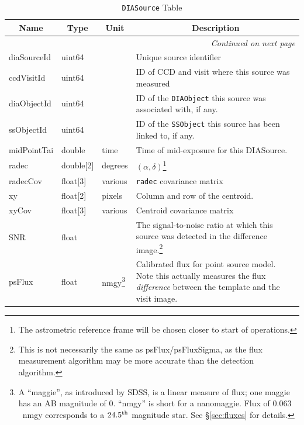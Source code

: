 \documentclass[12pt]{article}
\newcommand{\code}[1]{\texttt{#1}}
\newcommand{\DIASource}{\code{DIASource}\xspace}
\newcommand{\DIAObject}{\code{DIAObject}\xspace}
\newcommand{\SSObject}{\code{SSObject}\xspace}
\begin{document}
\begin{center}
\begin{longtable}{p{3cm}p{2cm}p{2cm}p{5cm}}
\caption[\DIASource Table]{\DIASource Table
} \\

\hline \multicolumn{1}{c}{\bf Name} & \multicolumn{1}{c}{\bf Type} & \multicolumn{1}{c}{\bf Unit} & \multicolumn{1}{c}{\bf Description} \\ \hline
\endhead

\hline \multicolumn{4}{r}{{\em Continued on next page}} \\
\endfoot

\hline\hline
\endlastfoot

diaSourceId & uint64 & ~ & Unique source identifier \\ 

ccdVisitId & uint64 & ~ & ID of CCD and visit where this source was measured \\ 

diaObjectId & uint64 & ~ & ID of the \DIAObject this source was associated with, if any. \\ 

ssObjectId & uint64 & ~ & ID of the \SSObject this source has been linked to, if any. \\ 

midPointTai & double & time & Time of mid-exposure for this DIASource. \\ 

radec & double[2] & degrees & $(\alpha, \delta)$\footnote{The astrometric reference frame will be chosen closer to start of operations.} \\ 

radecCov & float[3] & various & \texttt{radec} covariance matrix \\ 

xy & float[2] & pixels & Column and row of the centroid. \\ 

xyCov & float[3] & various & Centroid covariance matrix \\ 

SNR & float & ~ & The signal-to-noise ratio at which this source was detected in the difference image.\footnote{This is not necessarily the same as psFlux/psFluxSigma, as the flux measurement algorithm may be more accurate than the detection algorithm.} \\

psFlux & float & nmgy\footnote{A ``maggie'', as introduced by SDSS, is a linear measure of flux; one maggie has an AB magnitude of 0. ``nmgy'' is short for a nanomaggie. Flux of $0.063$~nmgy corresponds to a $24.5^{\rm th}$ magnitude star. See \S \ref{sec:fluxes} for details.} & Calibrated flux for point source model. Note this actually measures the flux {\em difference} between the template and the visit image. \\ 


\end{longtable}
\end{center}
\end{document}
